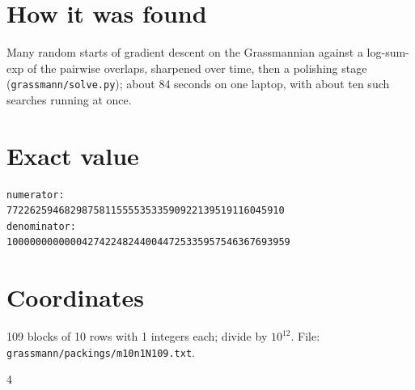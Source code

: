 \documentclass[11pt,a4paper]{article}
\begin{document}
\section{How it was found}
Many random starts of gradient descent on the Grassmannian against a log-sum-exp of the pairwise overlaps, sharpened over time, then a polishing stage (\texttt{grassmann/solve.py}); about 84 seconds on one laptop, with about ten such searches running at once.


\appendix
\section{Exact value}
{\small
\begin{verbatim}
numerator:
772262594682987581155553533590922139519116045910
denominator:
1000000000000427422482440044725335957546367693959
\end{verbatim}}

\section{Coordinates}
109 blocks of 10 rows with 1 integers each; divide by $10^{12}$. File: \texttt{grassmann/packings/m10n1N109.txt}.
{\tiny
\begin{multicols}{4}
\end{multicols}}
\end{document}
